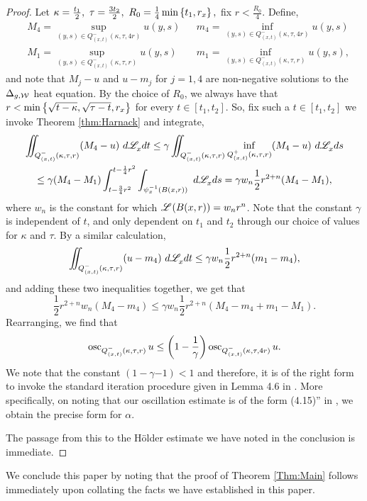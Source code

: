 \documentclass[a4paper, 12pt]{amsart}
\begin{document}
\begin{proof}
Let 
$\kappa = \frac{t_1}{2},\ \tau = \frac{3t_2}{2},\ R_0 = \frac{1}{4} \min\left\{t_1, r_x\right\},$ fix $r < \frac{R_0}{4}$.
Define, 
\begin{align*}
&M_4 = \sup_{(y,s) \in Q^{-}_{(x,t)}(\kappa, \tau, 4r)} u(y,s) &&m_4 = \inf_{(y,s) \in Q^{-}_{(x,t)}(\kappa, \tau, 4r)} u(y,s) \\
&M_1 = \sup_{(y,s) \in Q^{-}_{(x,t)}(\kappa, \tau, r)} u(y,s) &&m_1 = \inf_{(y,s) \in Q^{-}_{(x,t)}(\kappa, \tau, r)} u(y,s), 
\end{align*} 
and note that $M_j - u$ and $u - m_j$ for $j = 1, 4$ are non-negative
solutions to the $\Delta_{g,\mathcal{W}}$ heat equation.
By the choice of $R_0$,
we always have that $r < \min\left\{ \sqrt{t - \kappa}, \sqrt{\tau - t}, r_x\right\}$
for every $t \in [t_1, t_2]$. 
So, fix such a $t \in [t_1, t_2]$ we invoke Theorem \ref{thm:Harnack} and integrate,
\begin{multline*}
\iint_{Q^-_{(x,t)}(\kappa,\tau,r)} (M_4 - u)\ d\Leb_x dt 
	\leq \gamma \iint_{Q^-_{(x,t)}(\kappa,\tau,r)} \inf_{Q^+_{(x,t)}(\kappa, \tau, r)} (M_4 - u)\ d\Leb_x ds \\
	\leq \gamma (M_4 - M_1) \int_{t- \frac{3}{4}r^2}^{t - \frac{1}{4}r^2} \int_{\psi_x^{-1}(B(x,r))}\ d\Leb_x ds
	= \gamma w_n  \frac{1}{2}r^{2+n} (M_4 - M_1),$$
\end{multline*}
where $w_n$ is the constant for which $\mathscr{L}^{{}}(B(x,r)) = w_n r^n$.
Note that the constant $\gamma$ is independent of $t$, and only 
dependent on $t_1$ and $t_2$ through our choice
of values for $\kappa$ and $\tau$. 
By a similar calculation, 
$$
\iint_{Q^-_{(x,t)}(\kappa,\tau,r)} (u - m_4)\ d\Leb_x dt \leq \gamma w_n \frac{1}{2}r^{2+n} (m_1 - m_4),$$
and adding these two inequalities together, 
we get that
$$
\frac{1}{2}r^{2+n} w_n (M_4 - m_4) \leq \gamma w_n \frac{1}{2}r^{2+n} (M_4 - m_4 +m_1 - M_1).$$
Rearranging, we find that 
$$
\operatorname{osc}_{Q^{-}_{(x,t)}(\kappa, \tau, r)} u \leq \left(1 - \frac{1}{\gamma}\right) \operatorname{osc}_{Q^{-}_{(x,t)}(\kappa, \tau, 4r)} u.$$
We note that the constant $(1 - \gamma{-1}) < 1$
and therefore, it is of the right form to invoke the
standard iteration procedure given in Lemma 4.6 in \cite{Lieberman}. 
More specifically, on noting that
our oscillation estimate is of the form (4.15)'' in \cite{Lieberman},
we obtain the precise form for $\alpha$.

The passage from this to the Hölder estimate
we have noted in the conclusion is immediate. 
\end{proof}

We conclude this paper by noting that the proof of Theorem \ref{Thm:Main}
follows immediately upon collating the facts we have established
in this paper.




\setlength{\parskip}{0mm}
\end{document}
